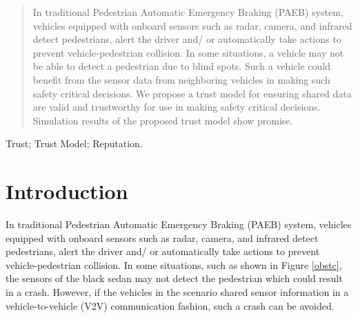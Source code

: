 \documentclass[conference]{IEEEtran}
\begin{document}




\maketitle
\thispagestyle{plain}
\pagestyle{plain}

\begin{abstract}
In traditional Pedestrian Automatic Emergency Braking (PAEB) system, vehicles equipped with onboard sensors such as radar, camera, and infrared detect pedestrians, alert the driver and/ or automatically take actions to prevent vehicle-pedestrian collision. In some situations, a vehicle may not be able to detect a pedestrian due to  blind spots. Such a vehicle could benefit from the sensor data from neighboring vehicles in making such safety critical decisions. We propose a trust model for ensuring shared data are valid and trustworthy for use in making safety critical decisions. Simulation results of the proposed trust model show promise.
\end{abstract}

\begin{IEEEkeywords}
Trust; Trust Model; Reputation. 

\end{IEEEkeywords}




%
\IEEEpeerreviewmaketitle



\section{Introduction}
In traditional Pedestrian Automatic Emergency Braking (PAEB) system, vehicles equipped with onboard sensors such as radar, camera, and infrared detect pedestrians, alert the driver and/ or automatically take actions to prevent vehicle-pedestrian collision. In some situations, such as shown in Figure \ref{obstc}, the sensors of the black sedan may not detect the pedestrian which could result in a crash. However, if the vehicles in the scenario shared sensor information in a  vehicle-to-vehicle (V2V) communication fashion, such a crash can be avoided.
\end{document}
